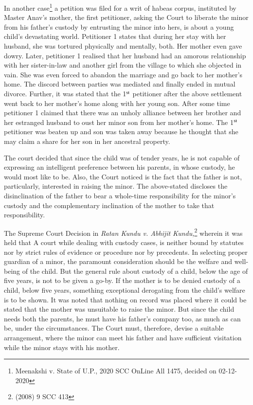 \begin{multicols}{2}
\noi
In another case\footnote{Meenakshi v. State of U.P., 2020 SCC OnLine All 1475, decided on 02-12-2020} a petition was filed for a writ of habeas corpus, instituted by Master Anav’s
mother, the first petitioner, asking the Court to liberate the minor from his father’s custody by
entrusting the minor into hers, is about a young child’s devastating world. Petitioner 1 states that
during her stay with her husband, she was tortured physically and mentally, both. Her mother
even gave dowry. Later, petitioner 1 realised that her husband had an amorous relationship with
her sister-in-law and another girl from the village to which she objected in vain. She was even
forced to abandon the marriage and go back to her mother’s home. The discord between parties
was mediated and finally ended in mutual divorce. Further, it was stated that the 1$^{\rm st}$ petitioner
after the above settlement went back to her mother’s home along with her young son. After some
time petitioner 1 claimed that there was an unholy alliance between her brother and her estranged
husband to oust her minor son from her mother’s home. The 1$^{\rm st}$ petitioner was beaten up and son was taken away because he thought that she may claim a share for her son in her ancestral property.

\noi
The court decided that since the child was of tender years, he is not capable of expressing an
intelligent preference between his parents, in whose custody, he would most like to be. Also, the
Court noticed is the fact that the father is not, particularly, interested in raising the minor. The
above-stated discloses the disinclination of the father to bear a whole-time responsibility for the
minor’s custody and the complementary inclination of the mother to take that responsibility.

\noi
The Supreme Court Decision in \textit{Ratan Kundu v. Abhijit Kundu,}\footnote{(2008) 9 SCC 413} wherein it was held that A court while dealing with custody cases, is neither bound by statutes nor by strict rules of evidence or procedure nor by precedents. In selecting proper guardian of a minor, the paramount consideration should be the welfare and well-being of the child. But the general rule about custody of a child, below the age of five years, is not to be given a go-by. If the mother is to be denied custody of a child, below five years, something exceptional derogating from the child’s welfare is to be shown. It was noted that nothing on record was placed where it could be stated that the
mother was unsuitable to raise the minor. But since the child needs both the parents, he must have
his father’s company too, as much as can be, under the circumstances. The Court must, therefore,
devise a suitable arrangement, where the minor can meet his father and have sufficient visitation
while the minor stays with his mother.


\end{multicols}
